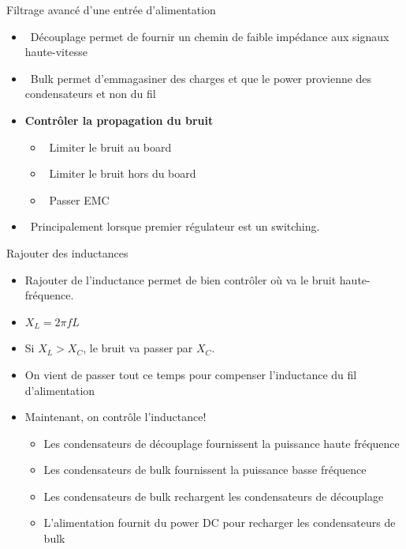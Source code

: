\begin{frame}{Filtrage avancé d'une entrée d'alimentation}
    \begin{itemize}
        \item[] \textcolor{UDSgreenFierte}{\faTachometer*} ~Découplage permet de fournir un chemin de faible impédance aux signaux haute-vitesse
        \item[] \textcolor{UDSgreenFierte}{\faBatteryThreeQuarters} ~Bulk permet d'emmagasiner des charges et que le power provienne des condensateurs et non du fil
        \bigskip
        \item<2-> \textbf{Contrôler la propagation du bruit}
        \begin{itemize}
            \item<2->[] \textcolor{UDSgreenFierte}{\faArrowRight} ~Limiter le bruit au board
            \item<2->[] \textcolor{UDSgreenFierte}{\faArrowLeft} ~Limiter le bruit hors du board
            \item<2->[] \textcolor{UDSgreenFierte}{\faFileContract} ~Passer EMC
        \end{itemize}
        \item<3->[] \textcolor{UDSgreenFierte}{\faProjectDiagram} ~Principalement lorsque premier régulateur est un switching.
    \end{itemize}
\end{frame}

\begin{frame}{Rajouter des inductances}
    \begin{itemize}
        \item Rajouter de l'inductance permet de bien contrôler où va le bruit haute-fréquence.
        \item $X_L = 2\pi fL$
        \item Si $X_L > X_C$, le bruit va passer par $X_C$.
        \bigskip
        \item On vient de passer tout ce temps pour compenser l'inductance du fil d'alimentation
        \item<2-> Maintenant, on contrôle l'inductance!
        \begin{itemize}
            \item<2-> Les condensateurs de découplage fournissent la puissance haute fréquence
            \item<2-> Les condensateurs de bulk fournissent la puissance basse fréquence
            \item<2-> Les condensateurs de bulk rechargent les condensateurs de découplage
            \item<2-> L'alimentation fournit du power DC pour recharger les condensateurs de bulk
        \end{itemize}
    \end{itemize}
\end{frame}

